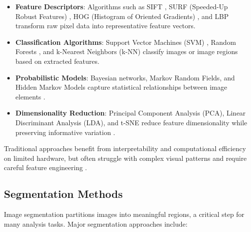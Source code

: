 \begin{itemize}
    \item \textbf{Feature Descriptors}: Algorithms such as SIFT \cite{lowe2004distinctive}, SURF (Speeded-Up Robust Features) \cite{bay2008speeded}, HOG (Histogram of Oriented Gradients) \cite{dalal2005histograms}, and LBP \cite{ojala2002multiresolution} transform raw pixel data into representative feature vectors.
    
    \item \textbf{Classification Algorithms}: Support Vector Machines (SVM) \cite{cortes1995support}, Random Forests \cite{breiman2001random}, and k-Nearest Neighbors (k-NN) \cite{cover1967nearest} classify images or image regions based on extracted features.
    
    \item \textbf{Probabilistic Models}: Bayesian networks, Markov Random Fields, and Hidden Markov Models capture statistical relationships between image elements \cite{bishop2006pattern}.
    
    \item \textbf{Dimensionality Reduction}: Principal Component Analysis (PCA), Linear Discriminant Analysis (LDA), and t-SNE reduce feature dimensionality while preserving informative variation \cite{wold1987principal}.
\end{itemize}

Traditional approaches benefit from interpretability and computational efficiency on limited hardware, but often struggle with complex visual patterns and require careful feature engineering \cite{szeliski2010computer}.

\subsection{Segmentation Methods}
Image segmentation partitions images into meaningful regions, a critical step for many analysis tasks. Major segmentation approaches include:

